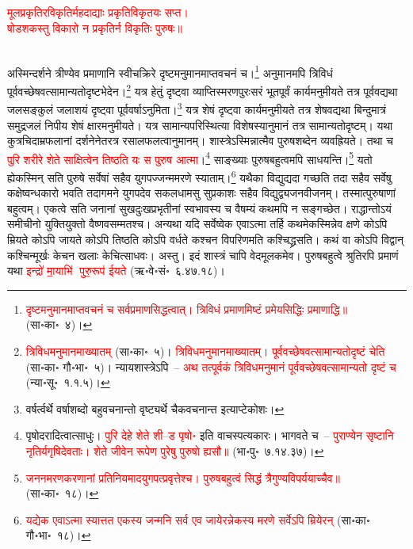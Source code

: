 \centering\textcolor{red}{मूलप्रकृतिरविकृतिर्महदाद्याः प्रकृतिविकृतयः सप्त। \nopagebreak\\
षोडशकस्तु विकारो न प्रकृतिर्न विकृतिः पुरुषः॥}\nopagebreak\\
\\
\begin{sloppypar}\justifying\noindent\hspace{10mm} अस्मिन्दर्शने त्रीण्येव प्रमाणानि स्वीचक्रिरे दृष्टमनु\-मानमाप्त\-वचनं च।\footnote{\textcolor{red}{दृष्टमनु\-मानमाप्त\-वचनं च सर्व\-प्रमाण\-सिद्धत्वात्। त्रिविधं प्रमाणमिष्टं प्रमेय\-सिद्धिः प्रमाणाद्धि॥} (सा॰का॰~४)।} अनुमानमपि त्रिविधं पूर्ववच्छेष\-वत्सामान्यतो\-दृष्ट\-भेदेन।\footnote{\textcolor{red}{त्रिविधमनु\-मानमाख्यातम्} (सा॰का॰~५)। \textcolor{red}{त्रिविधमनु\-मानमाख्यातम्। पूर्ववच्छेषवत्सामान्यतो\-दृष्टं चेति} (सा॰का॰ गौ॰भा॰~५)। न्यायशास्त्रेऽपि~– \textcolor{red}{अथ तत्पूर्वकं त्रिविधमनुमानं पूर्ववच्छेषवत्सामान्यतो दृष्टं च} (न्या॰सू॰~१.१.५)।} यत्र हेतुं दृष्ट्वा व्याप्तिस्मरण\-पुरःसरं भूतपूर्वं कार्यमनुमीयते तत्र पूर्ववद्यथा जलसङ्कुलं जलाशयं दृष्ट्वा पूर्ववर्षाऽनुमिता।\footnote{वर्षर्त्वर्थे वर्षा\-शब्दो बहुवचनान्तो वृष्ट्यर्थे चैकवचनान्त इत्याप्टे\-कोशः।} यत्र शेषं दृष्ट्वा कार्यमनुमीयते तत्र शेषवद्यथा बिन्दुमात्रं समुद्रजलं निपीय शेषं क्षारमनुमीयते। यत्र सामान्य\-परिस्थित्या विशेषस्यानुमानं तत्र सामान्यतो\-दृष्टम्। यथा कुत्रचिदाम्रफलानां दर्शनेनेतरत्र रसालफलत्वानुमानम्। शास्त्रेऽस्मिन्नात्मैव पुरुष\-शब्देन व्यवह्रियते। तथा च \textcolor{red}{पुरि शरीरे शेते साक्षित्वेन तिष्ठति यः स पुरुष आत्मा}।\footnote{पृषोदरादित्वात्साधुः। \textcolor{red}{पुरि देहे शेते शी–ड पृषो॰} इति वाचस्पत्यकारः। भागवते च~– \textcolor{red}{पुराण्येन सृष्टानि नृतिर्यगृषिदेवताः। शेते जीवेन रूपेण पुरेषु पुरुषो ह्यसौ॥} (भा॰पु॰~७.१४.३७)।} साङ्ख्याः पुरुषबहुत्वमपि साधयन्ति।\footnote{\textcolor{red}{जनन\-मरण\-करणानां प्रति\-नियमादयुगपत्प्रवृत्तेश्च। पुरुष\-बहुत्वं सिद्धं त्रैगुण्य\-विपर्ययाच्चैव॥} (सा॰का॰~१८)।} यतो ह्येकस्मिन् सति पुरुषे सर्वेषां सहैव युगपज्जन्ममरणे स्याताम्।\footnote{\textcolor{red}{यद्येक एवाऽत्मा स्यात्तत एकस्य जन्मनि सर्व एव जायेरन्नेकस्य मरणे सर्वेऽपि म्रियेरन्} (सा॰का॰ गौ॰भा॰~१८)।} यथैका विद्युद्यदा गच्छति तदा सहैव सर्वेषु कक्षेष्वन्धकारो भवति तदागमने युगपदेव सकल\-धामसु सुप्रकाशः सहैव विद्युद्व्यजन\-वीजनम्। तस्मात्पुरुषाणां बहुत्वम्। एकत्वे सति जनानां सुख\-दुःख\-प्रभृतीनां स्वभावस्य च वैषम्यं कथमपि न सङ्गच्छेत। राद्धान्तोऽयं समीचीनो युक्तियुक्तो वैष्णव\-सम्मतश्च। अन्यथा यदि सर्वेष्वेक एवाऽत्मा तर्हि कथमेकस्मिन्नेव क्षणे कोऽपि म्रियते कोऽपि जायते कोऽपि तिष्ठति कोऽपि वर्धते कश्चन विपरिणमति कश्चिद्ध्रसति। कथं वा कोऽपि विद्वान् कश्चिन्मूर्खः केचन खलाः केचित्साधवः। अस्तु। इदं शास्त्रं चापि वेदमूलकमेव। पुरुषबहुत्वे श्रुतिरपि प्रमाणं यथा \textcolor{red}{इन्द्रो॑ मा॒याभि॑ पुरु॒रूप॑ ईयते} (ऋ॰वे॰सं॰~६.४७.१८)।\end{sloppypar}
